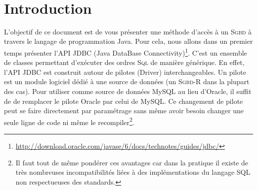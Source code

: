 \documentclass{article}
\date{}
\begin{document}

\newlength{\niveauZero}
\newlength{\niveauUn}
\newlength{\niveauDeux}
\newlength{\niveauTrois}
\newlength{\niveauQuatre}
\newlength{\niveauCinq}

\newlength{\colonneZero}
\newlength{\colonneUn}
\newlength{\colonneDeux}
\newlength{\colonneTrois}
\newlength{\colonneQuatre}
\newlength{\colonneCinq}


{\centering
    \mbox{
    }
}\\[0.4cm]
\section{Introduction}
L'objectif de ce document est de vous présenter une méthode d'accès à un \textsc{Sgbd} à travers le langage de programmation Java. Pour cela, nous allons dans un premier temps présenter l'API JDBC (Java DataBase Connectivity)\footnote{\url{http://download.oracle.com/javase/6/docs/technotes/guides/jdbc/}}. C'est un ensemble de classes permettant d'exécuter des ordres \textsc{Sql} de manière générique. En effet, l'API JDBC est construit autour de pilotes (Driver) interchangeables. Un pilote est un module logiciel  dédié à une source de données (un \textsc{Sgbd-R} dans la plupart des cas). Pour utiliser comme source de  données MySQL au lieu d'Oracle, il suffit de de remplacer le pilote Oracle par celui de MySQL.  Ce changement de pilote peut se faire directement par paramétrage sans même avoir besoin changer une seule ligne  de code ni même le recompiler\footnote{Il faut tout de même pondérer ces avantages car dans la pratique il existe  de très nombreuses incompatibilités liées à des implémentations du langage \textsc{SQL} non respectueuses des standards.}.
\end{document}

